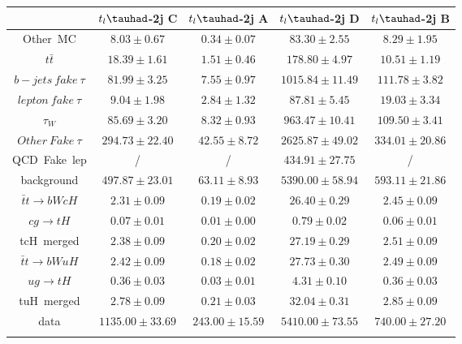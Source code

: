 \centering
\begin{tabular}{ccccc} \toprule\toprule
 & $t_{l}\tauhad$-2j C & $t_{l}\tauhad$-2j A & $t_{l}\tauhad$-2j D & $t_{l}\tauhad$-2j B\\\midrule
\hspace{3mm}Other~MC & $8.03\pm0.67$ & $0.34\pm0.07$ & $83.30\pm2.55$ & $8.29\pm1.95$\\
\hspace{3mm}$t\bar{t}$ & $18.39\pm1.61$ & $1.51\pm0.46$ & $178.80\pm4.97$ & $10.51\pm1.19$\\
\hspace{3mm}$b-jets~fake~\tau$ & $81.99\pm3.25$ & $7.55\pm0.97$ & $1015.84\pm11.49$ & $111.78\pm3.82$\\
\hspace{3mm}$lepton~fake~\tau$ & $9.04\pm1.98$ & $2.84\pm1.32$ & $87.81\pm5.45$ & $19.03\pm3.34$\\
\hspace{3mm}$\tau_{W}$ & $85.69\pm3.20$ & $8.32\pm0.93$ & $963.47\pm10.41$ & $109.50\pm3.41$\\
\hspace{3mm}$Other~Fake~\tau$ & $294.73\pm22.40$ & $42.55\pm8.72$ & $2625.87\pm49.02$ & $334.01\pm20.86$\\
\hspace{3mm}QCD~Fake~lep &  / &  / & $434.91\pm27.75$ &  /\\
background & $497.87\pm23.01$ & $63.11\pm8.93$ & $5390.00\pm58.94$ & $593.11\pm21.86$\\\midrule
\hspace{3mm}$\bar{t}t\to bWcH$ & $2.31\pm0.09$ & $0.19\pm0.02$ & $26.40\pm0.29$ & $2.45\pm0.09$\\
\hspace{3mm}$cg\to tH$ & $0.07\pm0.01$ & $0.01\pm0.00$ & $0.79\pm0.02$ & $0.06\pm0.01$\\
tcH~merged & $2.38\pm0.09$ & $0.20\pm0.02$ & $27.19\pm0.29$ & $2.51\pm0.09$\\
\hspace{3mm}$\bar{t}t\to bWuH$ & $2.42\pm0.09$ & $0.18\pm0.02$ & $27.73\pm0.30$ & $2.49\pm0.09$\\
\hspace{3mm}$ug\to tH$ & $0.36\pm0.03$ & $0.03\pm0.01$ & $4.31\pm0.10$ & $0.36\pm0.03$\\
tuH~merged & $2.78\pm0.09$ & $0.21\pm0.03$ & $32.04\pm0.31$ & $2.85\pm0.09$\\\midrule
data & $1135.00\pm33.69$ & $243.00\pm15.59$ & $5410.00\pm73.55$ & $740.00\pm27.20$\\
\bottomrule\bottomrule\\
\end{tabular}
